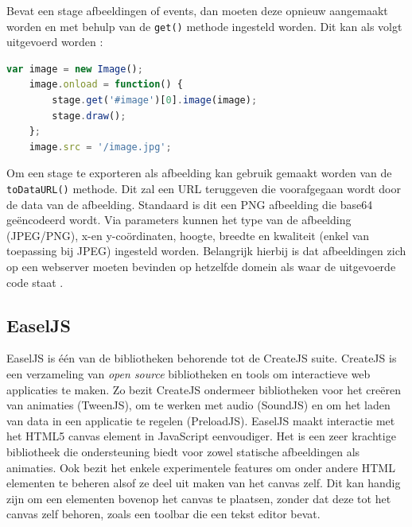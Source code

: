 Bevat een stage afbeeldingen of events, dan moeten deze opnieuw aangemaakt worden en met behulp van de \texttt{get()} methode ingesteld worden. Dit kan als volgt uitgevoerd worden \cite{KonvaLoad}:

\begin{lstlisting}[caption={Inladen van JSON data},label=lst:NodeServicePromise,language=javascript]
	var image = new Image();
	image.onload = function() {
	    stage.get('#image')[0].image(image);
	    stage.draw();
	};
	image.src = '/image.jpg';
\end{lstlisting}

Om een stage te exporteren als afbeelding kan gebruik gemaakt worden van de \texttt{toDataURL()} methode. Dit zal een URL teruggeven die voorafgegaan wordt door de data van de afbeelding. Standaard is dit een PNG afbeelding die base64 ge\"{e}ncodeerd wordt. Via parameters kunnen het type van de afbeelding (JPEG/PNG), x-en y-co\"{o}rdinaten, hoogte, breedte en kwaliteit (enkel van toepassing bij JPEG) ingesteld worden. Belangrijk hierbij is dat afbeeldingen zich op een webserver moeten bevinden op hetzelfde domein als waar de uitgevoerde code staat \cite{KonvaToImage}. 

\subsection{EaselJS} \label{easeljs}
EaselJS is \'{e}\'{e}n van de bibliotheken behorende tot de CreateJS suite. CreateJS is een verzameling van \textit{open source} bibliotheken en tools om interactieve web applicaties te maken. Zo bezit CreateJS ondermeer bibliotheken voor het cre\"{e}ren van animaties (TweenJS), om te werken met audio (SoundJS) en om het laden van data in een applicatie te regelen (PreloadJS). EaselJS maakt interactie met het HTML5 canvas element in JavaScript eenvoudiger. Het is een zeer krachtige bibliotheek die ondersteuning biedt voor zowel statische afbeeldingen als animaties. Ook bezit het enkele experimentele features om onder andere HTML elementen te beheren alsof ze deel uit maken van het canvas zelf. Dit kan handig zijn om een elementen bovenop het canvas te plaatsen, zonder dat deze tot het canvas zelf behoren, zoals een toolbar die een tekst editor bevat. 

